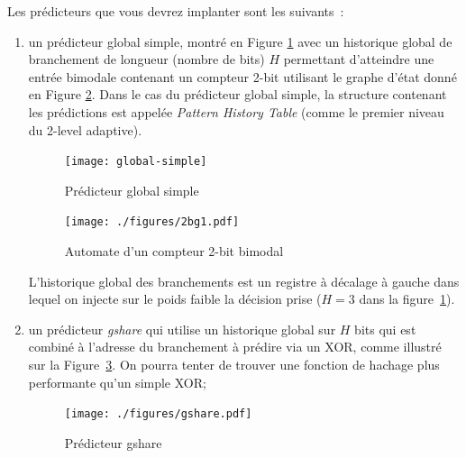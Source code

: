 \documentclass[a4paper]{article}
\begin{document}
Les prédicteurs que vous devrez implanter sont les suivants~:
\begin{enumerate}
\item un prédicteur global simple, montré en Figure \ref{global-simple} avec un historique global de branchement de longueur (nombre de bits) $H$ permettant d'atteindre une entrée bimodale contenant un compteur 2-bit utilisant le graphe d'état donné en Figure \ref{bimod}. Dans le cas du prédicteur global simple, la structure contenant les prédictions est appelée \textit{Pattern History Table} (comme le premier niveau du 2-level adaptive).

      \begin{figure}[hbt]\center\leavevmode
	\texttt{[image: global-simple]}
	\caption{Prédicteur global simple}
	\label{global-simple}
\end{figure}


\begin{figure}[htb]
	\center\texttt{[image: ./figures/2bg1.pdf]}
	\caption{Automate d'un compteur 2-bit bimodal}
	\label{bimod}
\end{figure}

   L'historique global des branchements est un registre à décalage à gauche dans lequel on injecte sur le poids faible la décision prise ($H=3$ dans la figure~\ref{global-simple}).


\item un prédicteur \textit{gshare} qui utilise un historique global sur $H$ bits qui est combiné à l'adresse du branchement à prédire via un XOR, comme illustré sur la Figure~\ref{correlated}. On pourra tenter de trouver une fonction de hachage plus performante qu'un simple XOR;
      \begin{figure}[hbt]\center\leavevmode
      \texttt{[image: ./figures/gshare.pdf]}
      \caption{\label{correlated}Prédicteur gshare}
      \end{figure}


\end{enumerate}
\end{document}
